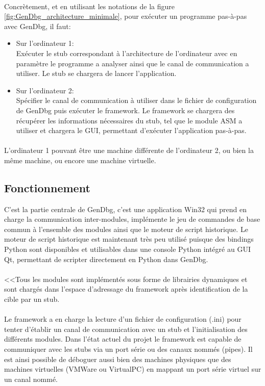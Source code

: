 \documentclass[11pt, book, english, french, standardlists]{upmethodology-document}
\begin{document}
				\paragraph*{}
					Concrètement, et en utilisant les notations de la figure \ref{fig:GenDbg_architecture_minimale}, pour exécuter un programme pas-à-pas avec GenDbg, il faut:
					\begin{itemize}
						\item Sur l'ordinateur 1:\\
							Exécuter le stub correspondant à l'architecture de l'ordinateur avec en paramètre le programme a analyser ainsi que le canal de communication a utiliser. Le stub se chargera de lancer l'application.
						\item Sur l'ordinateur 2:\\
							Spécifier le canal de communication à utiliser dans le fichier de configuration de GenDbg puis exécuter le framework. Le framework se chargera des récupérer les informations nécessaires du stub, tel que le module ASM a utiliser et chargera le \gls{GUI}, permettant d'exécuter l'application pas-à-pas.
					\end{itemize}
				\paragraph*{}
					L'ordinateur 1 pouvant être une machine différente de l'ordinateur 2, ou bien la même machine, ou encore une machine virtuelle.
			\subsection{Fonctionnement}
					C'est la partie centrale de GenDbg, c'est une application Win32 qui prend en charge la communication inter-modules, implémente le jeu de commandes de base commun à l'ensemble des modules ainsi que le moteur de script historique. Le moteur de script historique est maintenant très peu utilisé puisque des bindings Python sont  disponibles et utilisables dans une console Python intégré au \gls{GUI} Qt, permettant de scripter directement en Python dans GenDbg.
				\paragraph*{}
					<<Tous les modules sont implémentés sous forme de librairies dynamiques et sont chargés dans l'espace d'adressage du framework après identification de la cible par un stub.
				\paragraph*{}
					Le framework a en charge la lecture d'un fichier de configuration (.ini) pour tenter d'établir un canal de communication avec un stub et l'initialisation des différents modules. Dans l'état actuel du projet le framework est capable de communiquer avec les stubs via un port série ou des canaux nommés (pipes). Il est ainsi possible de déboguer aussi bien des machines physiques que des machines virtuelles (VMWare ou VirtualPC) en mappant un port série virtuel sur un canal nommé.
\end{document}
